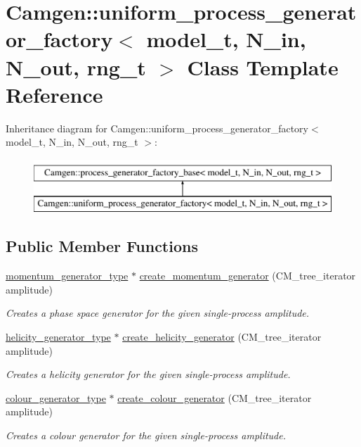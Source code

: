 \hypertarget{a00564}{}\section{Camgen\+:\+:uniform\+\_\+process\+\_\+generator\+\_\+factory$<$ model\+\_\+t, N\+\_\+in, N\+\_\+out, rng\+\_\+t $>$ Class Template Reference}
\label{a00564}
Inheritance diagram for Camgen\+:\+:uniform\+\_\+process\+\_\+generator\+\_\+factory$<$ model\+\_\+t, N\+\_\+in, N\+\_\+out, rng\+\_\+t $>$\+:\begin{figure}[H]
\begin{center}
\leavevmode
\includegraphics[height=2.000000cm]{a00564}
\end{center}
\end{figure}
\subsection*{Public Member Functions}
\begin{DoxyCompactItemize}
\item 
\hypertarget{a00564_ae1a8993ba53d772bdb2c26a45dbfd02c}{}\hyperlink{a00450}{momentum\+\_\+generator\+\_\+type} $\ast$ \hyperlink{a00564_ae1a8993ba53d772bdb2c26a45dbfd02c}{create\+\_\+momentum\+\_\+generator} (C\+M\+\_\+tree\+\_\+iterator amplitude)\label{a00564_ae1a8993ba53d772bdb2c26a45dbfd02c}

\begin{DoxyCompactList}\small\item\em Creates a phase space generator for the given single-\/process amplitude. \end{DoxyCompactList}\item 
\hyperlink{a00270}{helicity\+\_\+generator\+\_\+type} $\ast$ \hyperlink{a00564_a01af1c8ab5eecc0f7893b87c032a11c7}{create\+\_\+helicity\+\_\+generator} (C\+M\+\_\+tree\+\_\+iterator amplitude)
\begin{DoxyCompactList}\small\item\em Creates a helicity generator for the given single-\/process amplitude. \end{DoxyCompactList}\item 
\hyperlink{a00077}{colour\+\_\+generator\+\_\+type} $\ast$ \hyperlink{a00564_a1cc10bf21fa62ab396604192c1b0068f}{create\+\_\+colour\+\_\+generator} (C\+M\+\_\+tree\+\_\+iterator amplitude)
\begin{DoxyCompactList}\small\item\em Creates a colour generator for the given single-\/process amplitude. \end{DoxyCompactList}\end{DoxyCompactItemize}
